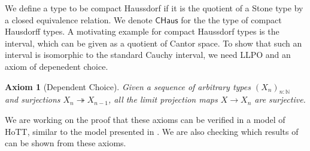 \documentclass[letterpaper]{../../util/easychair}
\newtheorem{axiom}{Axiom}
\newcommand{\N}{\mathbb{N}}
\newcommand{\CHaus}{\mathsf{CHaus}}
\newcommand{\Noo}{\N_{\infty}}
\newcommand{\ints}{\mathbb{Z}}
\begin{document}
We define a type to be compact Haussdorf if it is the quotient of a Stone type by a closed equivalence relation. 
We denote $\CHaus$ for the the type of compact Hausdorff types. 
A motivating example for compact Haussdorf types is the interval, which can be given as a quotient of Cantor space. 
To show that such an interval is isomorphic to the standard Cauchy interval, 
we need LLPO and an axiom of depenedent choice. 
\begin{axiom}[Dependent Choice]
  Given a sequence of arbitrary types $(X_n)_{n:\mathbb N}$ and surjections $X_n \twoheadrightarrow X_{n-1}$, 
  all the limit projection maps $X \to X_n$ are surjective. 
\end{axiom}



%
%
We are working on the proof that these axioms can be verified in a model of HoTT, 
similar to the model presented in \cite{draft}.
We are also checking which results of \cite{Scholze} can be shown from these axioms. 



\printbibliography
\end{document}
